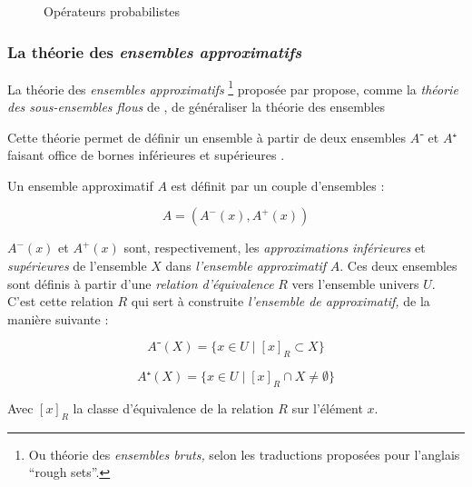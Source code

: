 \begin{figure}
  \begin{center}
    \caption{Opérateurs probabilistes}
    \label{fig:drast_op}
  \end{center}
\end{figure}

\subsubsection{La théorie des \emph{ensembles approximatifs}}

La théorie des \emph{ensembles approximatifs} \footnote{Ou théorie des
  \emph{ensembles bruts,} selon les traductions proposées pour
  l'anglais \enquote{rough sets}.} proposée par \textcite{Pawlak1982}
propose, comme la \emph{théorie des sous-ensembles flous} de
\textcite{Zadeh1965}, de généraliser la théorie des ensembles

Cette théorie permet de définir un ensemble à partir de deux ensembles
$A⁻$ et $A⁺$ faisant office de bornes inférieures et supérieures
\autocite{Gacogne1997}.

Un ensemble approximatif $A$ est définit par un couple d'ensembles :

\begin{equation}
  A = (A^-(x),A^+(x))  
\end{equation}

$A^-(x)$ et $A^+(x)$ sont, respectivement, les \emph{approximations}
\emph{inférieures} et \emph{supérieures} de l'ensemble $X$ dans
\emph{l'ensemble approximatif} $A$. Ces deux ensembles sont définis à
partir d'une \emph{relation d'équivalence} $R$ vers l'ensemble univers
$U$. C'est cette relation $R$ qui sert à construite \emph{l'ensemble
  de approximatif,} de la manière suivante :

\begin{equation}
  A⁻(X) = \{ x ∈ U ∣ [x]_R ⊂ X \}
\end{equation}

\begin{equation}
  A⁺(X) = \{ x ∈ U ∣ [x]_R ∩ X ≠ ∅ \}
\end{equation}

Avec $[x]_R$ la classe d'équivalence de la relation $R$ sur l'élément
$x$.

